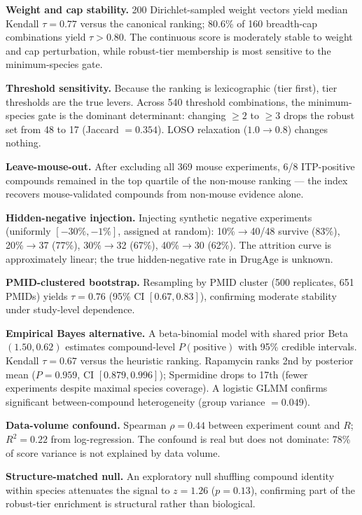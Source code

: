 \documentclass[10pt]{article}
\begin{document}
\textbf{Weight and cap stability.} 200 Dirichlet-sampled weight vectors yield median Kendall $\tau = 0.77$ versus the canonical ranking; 80.6\% of 160 breadth-cap combinations yield $\tau > 0.80$. The continuous score is moderately stable to weight and cap perturbation, while robust-tier membership is most sensitive to the minimum-species gate.

\textbf{Threshold sensitivity.} Because the ranking is lexicographic (tier first), tier thresholds are the true levers. Across 540 threshold combinations, the minimum-species gate is the dominant determinant: changing $\geq 2$ to $\geq 3$ drops the robust set from 48 to 17 (Jaccard $= 0.354$). LOSO relaxation ($1.0 \rightarrow 0.8$) changes nothing.

\textbf{Leave-mouse-out.} After excluding all 369 mouse experiments, 6/8 ITP-positive compounds remained in the top quartile of the non-mouse ranking --- the index recovers mouse-validated compounds from non-mouse evidence alone.

\textbf{Hidden-negative injection.} Injecting synthetic negative experiments (uniformly $[-30\%, -1\%]$, assigned at random): 10\%$\rightarrow$40/48 survive (83\%), 20\%$\rightarrow$37 (77\%), 30\%$\rightarrow$32 (67\%), 40\%$\rightarrow$30 (62\%). The attrition curve is approximately linear; the true hidden-negative rate in DrugAge is unknown.

\textbf{PMID-clustered bootstrap.} Resampling by PMID cluster (500 replicates, 651 PMIDs) yields $\tau = 0.76$ (95\% CI $[0.67, 0.83]$), confirming moderate stability under study-level dependence.

\textbf{Empirical Bayes alternative.} A beta-binomial model with shared prior Beta$(1.50, 0.62)$ estimates compound-level $P(\text{positive})$ with 95\% credible intervals. Kendall $\tau = 0.67$ versus the heuristic ranking. Rapamycin ranks 2nd by posterior mean ($P = 0.959$, CI $[0.879, 0.996]$); Spermidine drops to 17th (fewer experiments despite maximal species coverage). A logistic GLMM confirms significant between-compound heterogeneity (group variance $= 0.049$).

\textbf{Data-volume confound.} Spearman $\rho = 0.44$ between experiment count and $R$; $R^2 = 0.22$ from log-regression. The confound is real but does not dominate: 78\% of score variance is not explained by data volume.

\textbf{Structure-matched null.} An exploratory null shuffling compound identity within species attenuates the signal to $z = 1.26$ ($p = 0.13$), confirming part of the robust-tier enrichment is structural rather than biological.
\end{document}

